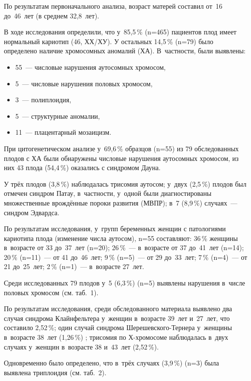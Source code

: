 По результатам первоначального анализа, возраст матерей составил от~16 до~46~лет (в среднем 32,8~лет).

В ходе исследования определили, что у~85,5\,\% (n=465) пациентов плод имеет нормальный кариотип (46, ХХ/ХУ). У остальных 14,5\,\% (n=79) было определено наличие хромосомных аномалий (ХА). В~частности, были выявлены:
\begin{itemize}[noitemsep]\vspace{-8pt}
  \item 55~--- числовые нарушения аутосомных хромосом,
\item  5~--- числовые нарушения половых хромосом,
\item  3~--- полиплоидия,
\item  5~--- структурные аномалии,
\item  11~--- плацентарный мозаицизм.
\end{itemize}
\vspace{-8pt}
При цитогенетическом анализе у~69,6\,\% образцов (n=55) из 79 обследованных плодов с ХА были обнаружены числовые нарушения аутосомных хромосом, из них 43 плода (54,4\,\%) оказались с синдромом Дауна.

У трёх плодов (3,8\,\%) наблюдалась трисомия аутосом; у~двух (2,5\,\%) плодов был отмечен синдром Патау, в~частности, у~одной были диагностированы множественные врождённые пороки развития (МВПР); в~7 (8,9\,\%) случаях~--- синдром Эдвардса.

По результатам исследования, у~групп беременных женщин с патологиями кариотипа плода (изменение числа аутосом), n=55 составляют: 36\,\% женщины в~возрасте от 33 до~37~лет (n=20); 26\,\%~--- в~возрасте от 37 до~41~лет (n=14); 20\,\% (n=11)~--- от 41 до~46~лет; 9\,\% (n=5)~--- от 29 до~33~лет; 7\,\% (n=4)~--- от 21 до~25~лет; 2\,\% (n=1)~--- в~возрасте 27~лет.

Среди исследованных 79 плодов у~5 (6,3\,\%) (n=5) выявлены нарушения в~числе половых хромосом (см. таб.~1).



По результатам исследования, среди обследованного материала выявлено два случая синдрома Клайнфельтера у~женщин в~возрасте 39~лет и~27~лет, что составило 2,52\,\%; один случай синдрома Шерешевского-Тернера у~женщины в~возрасте 38~лет (1,26\,\%) ; трисомия по Х-хромосоме наблюдалась в~двух случаях у~женщин в~возрасте 38 и~43~лет (2,52\,\%).

Одновременно было определено, что в~трёх случаях (3,9\,\%) (n=3) была выявлена триплоидия (см. таб.~2).

